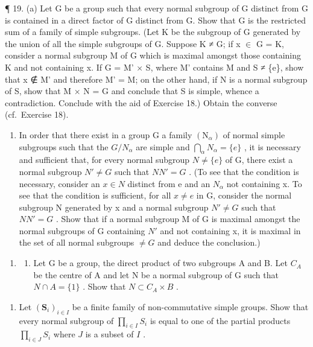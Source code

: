 ¶ 19. (a) Let G be a group such that every normal subgroup of G distinct from G is contained in a direct factor of G distinct from G. Show that G is the restricted sum of a family of simple subgroups. (Let K be the subgroup of G generated by the union of all the simple subgroups of G. Suppose K ≠ G; if x \ensuremath{\in} G = K, consider a normal subgroup M of G which is maximal amongst those containing K and not containing x. If G = M' × S, where M' contains M and S ≠ \{e\}, show that x ∉ M' and therefore M' = M; on the other hand, if N is a normal subgroup of S, show that M × N = G and conclude that S is simple, whence a contradiction. Conclude with the aid of Exercise 18.) Obtain the converse (cf.~Exercise 18).

\begin{enumerate}
\def\labelenumi{(\alph{enumi})}
\setcounter{enumi}{1}
\tightlist
\item
  In order that there exist in a group G a family \((\mathrm{N}_{\alpha})\) of normal simple subgroups such that the \(G/N_{\alpha}\) are simple and \(\bigcap_{\alpha} N_{\alpha} = \{e\}\) , it is necessary and sufficient that, for every normal subgroup \(N \neq \{e\}\) of G, there exist a normal subgroup \(N' \neq G\) such that \(NN' = G\) . (To see that the condition is necessary, consider an \(x \in N\) distinct from e and an \(N_{\alpha}\) not containing x. To see that the condition is sufficient, for all \(x \neq e\) in G, consider the normal subgroup N generated by x and a normal subgroup \(N' \neq G\) such that \(NN' = G\) . Show that if a normal subgroup M of G is maximal amongst the normal subgroups of G containing \(N'\) and not containing x, it is maximal in the set of all normal subgroups \(\neq G\) and deduce the conclusion.)
\end{enumerate}

\begin{enumerate}
\def\labelenumi{\arabic{enumi}.}
\setcounter{enumi}{19}
\tightlist
\item
  \begin{enumerate}
  \def\labelenumii{(\alph{enumii})}
  \tightlist
  \item
    Let G be a group, the direct product of two subgroups A and B. Let \(C_{A}\) be the centre of A and let N be a normal subgroup of G such that \(N \cap A = \{1\}\) . Show that \(N \subset C_{A} \times B\) .
  \end{enumerate}
\end{enumerate}

\begin{enumerate}
\def\labelenumi{(\alph{enumi})}
\setcounter{enumi}{1}
\tightlist
\item
  Let \((\mathbf{S}_i)_{i\in I}\) be a finite family of non-commutative simple groups. Show that every normal subgroup of \(\prod_{i\in I}S_i\) is equal to one of the partial products \(\prod_{i\in J}S_i\) where \(J\) is a subset of \(I\) .
\end{enumerate}

